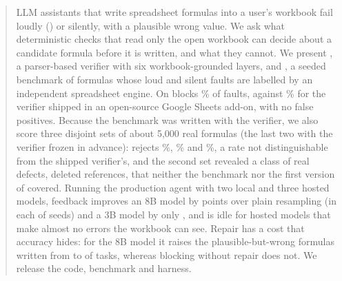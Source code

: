 \begin{abstract}
LLM assistants that write spreadsheet formulas into a user's workbook fail loudly () or silently, with a plausible wrong value. We ask what deterministic checks that read only the open workbook can decide about a candidate formula before it is written, and what they cannot. We present \gc, a parser-based verifier with six workbook-grounded layers, and \sheetfault, a seeded benchmark of \nBenchTotal{} formulas whose loud and silent faults are labelled by an independent spreadsheet engine. On \sheetfault{} \gc{} blocks \eonevtworejectR\% of faults, against \eonevonerejectR\% for the verifier shipped in an open-source Google Sheets add-on, with no false positives. Because the benchmark was written with the verifier, we also score three disjoint sets of about 5{,}000 real formulas (the last two with the verifier frozen in advance): \gc{} rejects \rwcTVtwoReject\%, \rwcFVtwoReject\% and \rwcGVtwoReject\%, a rate not distinguishable from the shipped verifier's, and the second set revealed a class of real defects, deleted references, that neither the benchmark nor the first version of \gc{} covered. Running the production agent with two local and three hosted models, \gc{} feedback improves an 8B model by \sdADvtwofbresample{} points over plain resampling (in each of \sdASeeds{} seeds) and a 3B model by only \sdBDvtwofbresample, and is idle for hosted models that make almost no errors the workbook can see. Repair has a cost that accuracy hides: for the 8B model it raises the plausible-but-wrong formulas written from \hmAAsIsSilent{} to \hmARepVtwoSilent{} of \hmAN{} tasks, whereas blocking without repair does not. We release the code, benchmark and harness.
\end{abstract}
